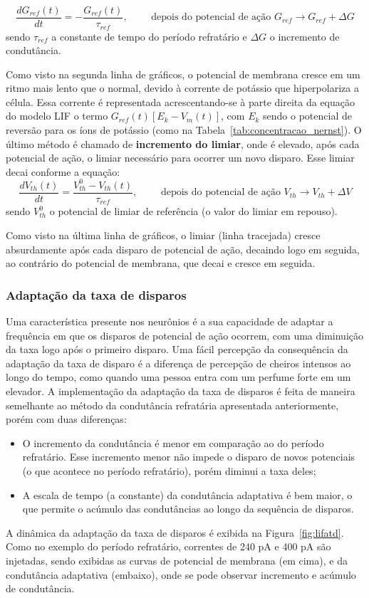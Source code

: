 \begin{equation}\label{eq:condutancia_refrataria}
	\frac{dG_{ref}(t)}{dt} = -\frac{G_{ref}(t)}{\tau_{ref}}, \qquad\text{ depois do potencial de ação } G_{ref} \to G_{ref} + \Delta G
\end{equation}
sendo $\tau_{ref}$ a constante de tempo do período refratário e $\Delta G$ o incremento de condutância.

Como visto na segunda linha de gráficos, o potencial de membrana cresce em um ritmo mais lento que o normal, devido à corrente de potássio que hiperpolariza a célula. Essa corrente é representada acrescentando-se à parte direita da equação do modelo LIF o termo $G_{ref}(t)[E_k-V_m(t)]$, com $E_k$ sendo o potencial de reversão para os íons de potássio (como na Tabela~\ref{tab:concentracao_nernst}). O último método é chamado de \textbf{incremento do limiar}, onde é elevado, após cada potencial de ação, o limiar necessário para ocorrer um novo disparo. Esse limiar decai conforme a equação:
\begin{equation}\label{eq:incremento_limiar}
	\frac{dV_{th}(t)}{dt} = \frac{V^0_{th}-V_{th}(t)}{\tau_{ref}}, \qquad\text{ depois do potencial de ação } V_{th} \to V_{th} + \Delta V
\end{equation}
sendo $V^0_{th}$ o potencial de limiar de referência (o valor do limiar em repouso).

Como visto na última linha de gráficos, o limiar (linha tracejada) cresce absurdamente após cada disparo de potencial de ação, decaindo logo em seguida, ao contrário do potencial de membrana, que decai e cresce em seguida. 

\subsubsection{Adaptação da taxa de disparos}
Uma característica presente nos neurônios é a sua capacidade de adaptar a frequência em que os disparos de potencial de ação ocorrem, com uma diminuição da taxa logo após o primeiro disparo. Uma fácil percepção da consequência da adaptação da taxa de disparo é a diferença de percepção de cheiros intensos ao longo do tempo, como quando uma pessoa entra com um perfume forte em um elevador. A implementação da adaptação da taxa de disparos é feita de maneira semelhante ao método da condutância refratária apresentada anteriormente, porém com duas diferenças:
\begin{itemize}
	\item O incremento da condutância é menor em comparação ao do período refratário. Esse incremento menor não impede o disparo de novos potenciais (o que acontece no período refratário), porém diminui a taxa deles;
	\item A escala de tempo (a constante) da condutância adaptativa é bem maior, o que permite o acúmulo das condutâncias ao longo da sequência de disparos.
\end{itemize}
A dinâmica da adaptação da taxa de disparos é exibida na Figura~\ref{fig:lifatd}. Como no exemplo do período refratário, correntes de 240 pA e 400 pA são injetadas, sendo exibidas as curvas de potencial de membrana (em cima), e da condutância adaptativa (embaixo), onde se pode observar incremento e acúmulo de condutância.

